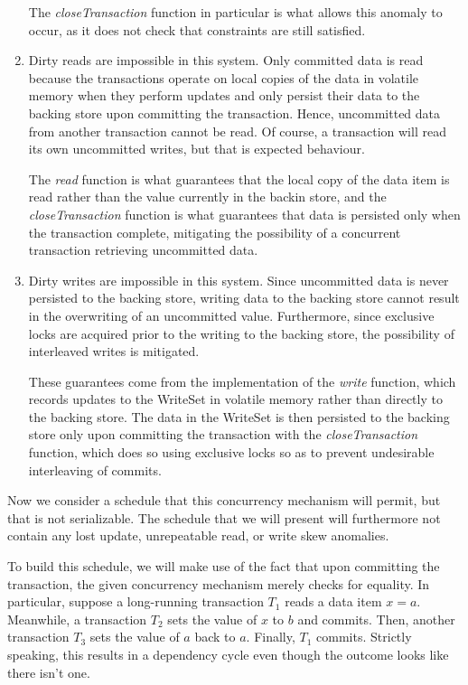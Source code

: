 \documentclass{article}
\begin{document}
\begin{enumerate}
        The \emph{closeTransaction} function in particular is what allows this
        anomaly to occur, as it does not check that constraints are still
        satisfied.

    \item
        Dirty reads are impossible in this system. Only committed data is read
        because the transactions operate on local copies of the data in
        volatile memory when they perform updates and only persist their data
        to the backing store upon committing the transaction. Hence,
        uncommitted data from another transaction cannot be read. Of course, a
        transaction will read its own uncommitted writes, but that is expected
        behaviour.

        The \emph{read} function is what guarantees that the local copy of the
        data item is read rather than the value currently in the backin store,
        and the \emph{closeTransaction} function is what guarantees that data
        is persisted only when the transaction complete, mitigating the
        possibility of a concurrent transaction retrieving uncommitted data.

    \item
        Dirty writes are impossible in this system. Since uncommitted data is
        never persisted to the backing store, writing data to the backing store
        cannot result in the overwriting of an uncommitted value. Furthermore,
        since exclusive locks are acquired prior to the writing to the backing
        store, the possibility of interleaved writes is mitigated.

        These guarantees come from the implementation of the \emph{write}
        function, which records updates to the WriteSet in volatile memory
        rather than directly to the backing store. The data in the WriteSet is
        then persisted to the backing store only upon committing the
        transaction with the \emph{closeTransaction} function, which does so
        using exclusive locks so as to prevent undesirable interleaving of
        commits.
\end{enumerate}

Now we consider a schedule that this concurrency mechanism will permit, but
that is not serializable. The schedule that we will present will furthermore
not contain any lost update, unrepeatable read, or write skew anomalies.

To build this schedule, we will make use of the fact that upon committing the
transaction, the given concurrency mechanism merely checks for equality. In
particular, suppose a long-running transaction $T_1$ reads a data item $x = a$.
Meanwhile, a transaction $T_2$ sets the value of $x$ to $b$ and commits. Then,
another transaction $T_3$ sets the value of $a$ back to $a$. Finally, $T_1$
commits. Strictly speaking, this results in a dependency cycle even though the
outcome looks like there isn't one.
\end{document}
